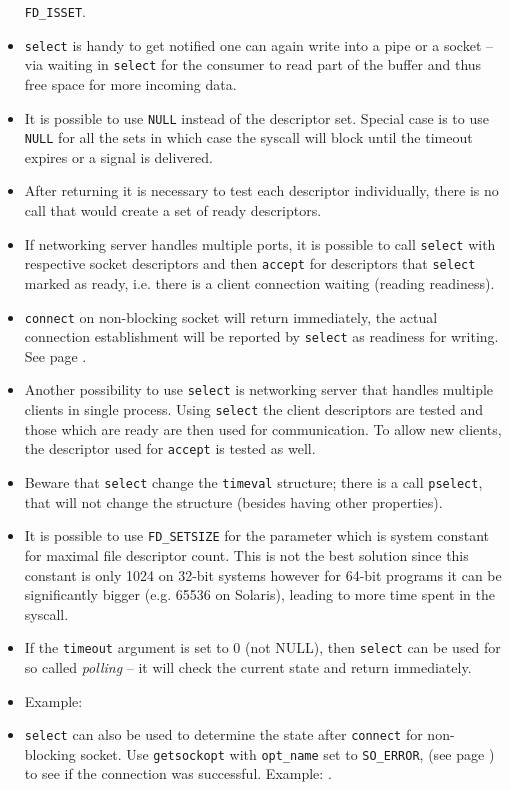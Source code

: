 \begin{itemize}
\texttt{FD\_ISSET}.
\item \texttt{select} is handy to get notified one can again write into a pipe
or a socket -- via waiting in \texttt{select} for the consumer to read part of
the buffer and thus free space for more incoming data.
\item It is possible to use \texttt{NULL} instead of the descriptor set. Special
case is to use \texttt{NULL} for all the sets in which case the syscall will
block until the timeout expires or a signal is delivered.
\item After returning it is necessary to test each descriptor individually,
there is no call that would create a set of ready descriptors.
\item If networking server handles multiple ports, it is possible to call
\texttt{select} with respective socket descriptors and then \texttt{accept}
for descriptors that \texttt{select} marked as ready, i.e. there is a client
connection waiting (reading readiness).
\item \texttt{connect} on non-blocking socket will return immediately, the
actual connection establishment will be reported by \texttt{select} as readiness
for writing. See page \pageref{CONNECT}.
\item Another possibility to use \texttt{select} is networking server that
handles multiple clients in single process. Using \texttt{select} the client
descriptors are tested and those which are ready are then used for
communication. To allow new clients, the descriptor used for \texttt{accept} is
tested as well.
\item Beware that \texttt{select}  change the \texttt{timeval}
structure; there is a call \texttt{pselect}, that will not change the structure
(besides having other properties).
\item It is possible to use \texttt{FD\_SETSIZE} for the 
parameter which is system constant for maximal file descriptor count. This is
not the best solution since this constant is only 1024 on 32-bit systems however
for 64-bit programs it can be significantly bigger (e.g. 65536 on Solaris),
leading to more time spent in the syscall.
\item If the \texttt{timeout} argument is set to 0 (not NULL), then
\texttt{select} can be used for so called \emph{polling} -- it will check the
current state and return immediately.
\item Example:  
\item \texttt{select} can also be used to determine the state after
\texttt{connect} for non-blocking socket. Use \texttt{getsockopt} with
\texttt{opt\_name} set to \texttt{SO\_ERROR}, (see page \pageref{GETSOCKOPT}) to
see if the connection was successful.
 Example: .


\end{itemize}

